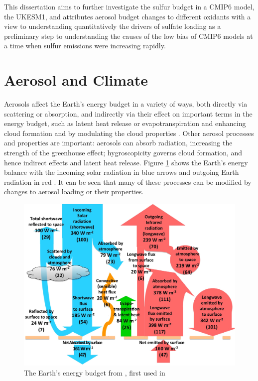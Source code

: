 This dissertation aims to further investigate the sulfur budget in a CMIP6 model, the UKESM1, and attributes aerosol budget changes to different oxidants with a view to understanding quantitatively the drivers of sulfate loading as a preliminary step to understanding the causes of the low bias of CMIP6 models at a time when sulfur emissions were increasing rapidly. 


\section{Aerosol and Climate} %

Aerosols affect the Earth’s energy budget in a variety of ways, both directly via scattering or absorption, and indirectly via their effect on important terms in the energy budget, such as latent heat release or evapotranspiration and enhancing cloud formation and by modulating the cloud properties \citep{readGlobalEnergyBudgets2016}.  Other aerosol processes and properties are important: aerosols can absorb radiation, increasing the strength of the greenhouse effect; hygroscopicity governs cloud formation, and hence indirect effects and latent heat release. Figure \ref{fig:trenberth} shows the Earth's energy balance with the incoming solar radiation in blue arrows and outgoing Earth radiation in red \citep{kiehlEarthAnnualGlobal1997}.  It can be seen that many of these processes can be modified by changes to aerosol loading or their properties. 

\begin{figure}
    \centering
    \includegraphics[width=0.7\columnwidth]{Chapter1/figs/01_trenberth.jpg}
    \caption[The Earth’s energy budget]{The Earth’s energy budget from \citet{readGlobalEnergyBudgets2016}, first used in \citet{kiehlEarthAnnualGlobal1997}}
    \label{fig:trenberth}
\end{figure}


